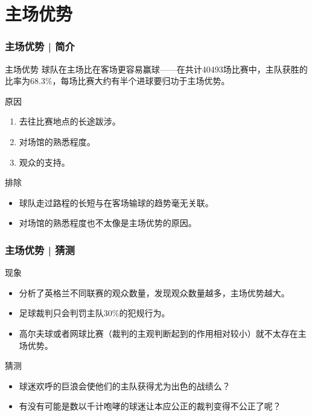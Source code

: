 \section{主场优势}
\begin{frame}
  \frametitle{主场优势 | 简介}
  \begin{block}{主场优势}
    球队在主场比在客场更容易赢球——在共计40493场比赛中，主队获胜的比率为68.3\%，每场比赛大约有半个进球要归功于主场优势。
  \end{block}
  \pause
  \begin{block}{原因}
    \begin{enumerate}
      \item 去往比赛地点的长途跋涉。
      \item 对场馆的熟悉程度。
      \item 观众的支持。
    \end{enumerate}
  \end{block}
  \pause
  \begin{block}{排除}
    \begin{itemize}
      \item 球队走过路程的长短与在客场输球的趋势毫无关联。
      \item 对场馆的熟悉程度也不太像是主场优势的原因。
    \end{itemize}
  \end{block}
\end{frame}

\begin{frame}
  \frametitle{主场优势 | 猜测}
  \begin{block}{现象}
    \begin{itemize}
      \item 分析了英格兰不同联赛的观众数量，发现观众数量越多，主场优势越大。
      \item 足球裁判只会判罚主队30\%的犯规行为。
      \item 高尔夫球或者网球比赛（裁判的主观判断起到的作用相对较小）就不太存在主场优势。
    \end{itemize}
  \end{block}
  \pause
  \begin{block}{猜测}
    \begin{itemize}
      \item 球迷欢呼的巨浪会使他们的主队获得尤为出色的战绩么？
      \item 有没有可能是数以千计咆哮的球迷让本应公正的裁判变得不公正了呢？
    \end{itemize}
  \end{block}
\end{frame}

